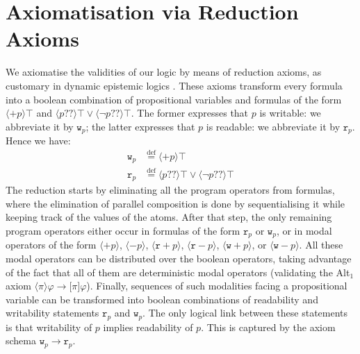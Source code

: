 \documentclass{llncs}
\newcommand{\readable}[1]{\mathtt{r}_{#1}}
\newcommand{\writable}[1]{\mathtt{w}_{#1}}
\newcommand{\testendo}{?\!\!?}			%
\newcommand{\assgntopR}[1]{{\mathtt r {+} #1}}
\newcommand{\assgnbotR}[1]{{\mathtt r {-} #1}}
\newcommand{\assgntopW}[1]{{\mathtt w {+} #1}}
\newcommand{\assgnbotW}[1]{{\mathtt w {-} #1}}
\newcommand{\assgntopV}[1]{{\mathtt {+} #1}}
\newcommand{\assgnbotV}[1]{{\mathtt {-} #1}}
\newcommand{\eqdef}{\stackrel{\text{def}}{=}}
\newcommand{\lbox}[1]{ \big[ #1 \big] }
\newcommand{\ldia}[1]{ \big\langle #1 \big\rangle}
\newcommand{\leqv}{ \leftrightarrow }
\newcommand{\limp}{ \rightarrow }
\renewcommand{\phi}{\varphi}
\begin{document}
\section{Axiomatisation via Reduction Axioms}\label{sec:axiomatisation}

We axiomatise the validities of our logic by means of reduction axioms, as customary in dynamic epistemic logics \cite{DitmarschHoekKooi07}. 
These axioms transform every formula into a boolean combination of propositional variables
and formulas of the form
$\ldia{ \assgntopV p } \top $ and 
$\ldia{ p \testendo} \top \lor \ldia{ \lnot p \testendo} \top $. 
The former expresses that $p$ is writable: we abbreviate it by $\writable{p}$;
the latter expresses that $p$ is readable: we abbreviate it by $\readable p$. 
Hence we have:
\begin{align*}
\writable{p} &\eqdef \ldia{ \assgntopV p } \top 
\\
\readable p &\eqdef \ldia{ p \testendo} \top \lor \ldia{ \lnot p \testendo} \top 
\end{align*}
The reduction starts by eliminating all the program operators from formulas, where 
the elimination of parallel composition is done by sequentialising it while keeping track of the values of the atoms. 
After that step, the only remaining program operators 
either occur in formulas of the form $\readable p$ or $\writable p$, 
or in modal operators of the form
$\ldia{ \assgntopV p} $,
$\ldia{ \assgnbotV p} $,
$\ldia{ \assgntopR p} $,
$\ldia{ \assgnbotR p} $,
$\ldia{ \assgntopW p} $, or
$\ldia{ \assgnbotW p} $. 
All these modal operators can be distributed over the boolean operators, taking advantage of the fact that all of them are deterministic modal operators 
(validating the Alt$_1$ axiom $\ldia \pi \phi \limp \lbox \pi \phi$). 
Finally, sequences of such modalities facing a propositional variable can be transformed into 
boolean combinations of readability and writability statements $\readable p$ and $\writable p$.
The only logical link between these statements is that 
writability of $p$ implies readability of $p$. 
This is captured by the axiom schema 
$\writable p \limp \readable p$.
\end{document}
